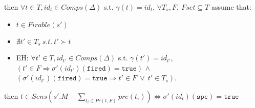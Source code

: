 \documentclass[dvipsnames,12pt]{article}
\begin{document}
\begin{lemma}
  \label{lem:stab-compute-pcomb}
  \fehyps{} then
  $\forall{}t\in{}T,id_t\in{}Comps(\Delta)$ s.t. $\gamma(t)=id_t$,
  $\forall{}T_s,F,~Fset\subseteq{}T$ assume that:
  \begin{itemize}
  \item $t\in{}Firable(s')$
  \item $\nexists{}t'\in{}T_s~s.t.~t'\succ{}t$
  \item EH: $\forall{}t'\in{}T,id_{t'}\in{}Comps(\Delta)$
    s.t. $\gamma(t')=id_{t'}$,\\
    $(t'\in{}F\Rightarrow\sigma'(id_{t'})(\texttt{fired})=\mathtt{true})$
    $\land$
    $(\sigma'(id_{t'})(\texttt{fired})=\mathtt{true}\Rightarrow{}t'\in{}F~\lor~{}t'\in{}T_s)$.

  \end{itemize}
  then
  $t\in{}Sens(s'.M-\sum\limits_{t_i\in{}Pr(t,F)}pre(t_i))\Leftrightarrow\sigma'(id_t)(\texttt{spc})=\mathtt{true}$
\end{lemma}
\end{document}
